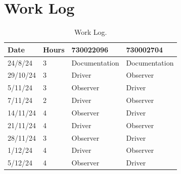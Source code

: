 \documentclass{article}
\begin{document}
    \section{Work Log}
    \begin{table}[H]
        \centering
        \begin{tabular}{llll}
            \toprule
            \textbf{Date} & \textbf{Hours} & \textbf{730022096} & \textbf{730002704} \\
            \midrule
            24/8/24       & 3              & Documentation      & Documentation      \\
            29/10/24      & 3              & Driver             & Observer           \\
            5/11/24       & 3              & Observer           & Driver             \\
            7/11/24       & 2              & Driver             & Observer           \\
            14/11/24      & 4              & Observer           & Driver             \\
            21/11/24      & 4              & Driver             & Observer           \\
            28/11/24      & 3              & Observer           & Driver             \\
            1/12/24       & 4              & Driver             & Observer           \\
            5/12/24       & 4              & Observer           & Driver             \\
            \bottomrule
        \end{tabular}
        \caption{Work Log.}
        \label{tab:work-log}
    \end{table}
\end{document}
